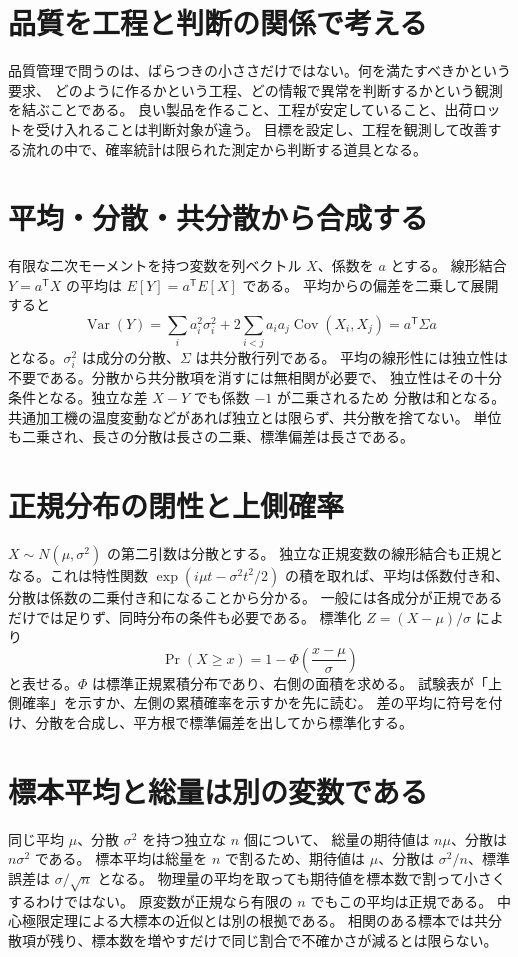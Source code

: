 \section{品質を工程と判断の関係で考える}
\label{theory:quality:background}
品質管理で問うのは、ばらつきの小ささだけではない。何を満たすべきかという要求、
どのように作るかという工程、どの情報で異常を判断するかという観測を結ぶことである。
良い製品を作ること、工程が安定していること、出荷ロットを受け入れることは判断対象が違う。
目標を設定し、工程を観測して改善する流れの中で、確率統計は限られた測定から判断する道具となる。

\section{平均・分散・共分散から合成する}
\label{theory:quality:variance}
有限な二次モーメントを持つ変数を列ベクトル \(X\)、係数を \(a\) とする。
線形結合 \(Y=a^{\mathsf T}X\) の平均は \(E[Y]=a^{\mathsf T}E[X]\) である。
平均からの偏差を二乗して展開すると
\[
 \operatorname{Var}(Y)
 =\sum_i a_i^2\sigma_i^2+2\sum_{i<j}a_i a_j\operatorname{Cov}(X_i,X_j)
 =a^{\mathsf T}\Sigma a
\]
となる。\(\sigma_i^2\) は成分の分散、\(\Sigma\) は共分散行列である。
平均の線形性には独立性は不要である。分散から共分散項を消すには無相関が必要で、
独立性はその十分条件となる。独立な差 \(X-Y\) でも係数 \(-1\) が二乗されるため
分散は和となる。共通加工機の温度変動などがあれば独立とは限らず、共分散を捨てない。
単位も二乗され、長さの分散は長さの二乗、標準偏差は長さである。\cite{stat_psu_linear}

\section{正規分布の閉性と上側確率}
\label{theory:quality:normal}
\(X\sim N(\mu,\sigma^2)\) の第二引数は分散とする。
独立な正規変数の線形結合も正規となる。これは特性関数
\(\exp(i\mu t-\sigma^2t^2/2)\) の積を取れば、平均は係数付き和、
分散は係数の二乗付き和になることから分かる。
一般には各成分が正規であるだけでは足りず、同時分布の条件も必要である。
標準化 \(Z=(X-\mu)/\sigma\) により
\[
 \Pr(X\ge x)=1-\Phi\!\left(\frac{x-\mu}{\sigma}\right)
\]
と表せる。\(\Phi\) は標準正規累積分布であり、右側の面積を求める。
試験表が「上側確率」を示すか、左側の累積確率を示すかを先に読む。
差の平均に符号を付け、分散を合成し、平方根で標準偏差を出してから標準化する。\cite{stat_nist_normal}

\section{標本平均と総量は別の変数である}
\label{theory:quality:sample_mean}
同じ平均 \(\mu\)、分散 \(\sigma^2\) を持つ独立な \(n\) 個について、
総量の期待値は \(n\mu\)、分散は \(n\sigma^2\) である。
標本平均は総量を \(n\) で割るため、期待値は \(\mu\)、分散は
\(\sigma^2/n\)、標準誤差は \(\sigma/\sqrt n\) となる。
物理量の平均を取っても期待値を標本数で割って小さくするわけではない。
原変数が正規なら有限の \(n\) でもこの平均は正規である。
中心極限定理による大標本の近似とは別の根拠である。
相関のある標本では共分散項が残り、標本数を増やすだけで同じ割合で不確かさが減るとは限らない。

